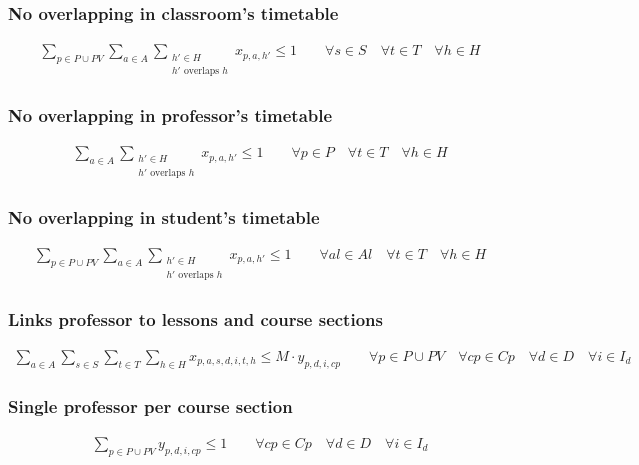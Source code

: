 \subsubsection{No overlapping in classroom's timetable}
\begin{eqnarray}
\sum\limits_{p \in P \cup PV} \sum\limits_{a \in A} \sum\limits_{\substack {h' \in H \\ h'\mbox{ overlaps }h}} x_{p,a,h'} \leq  1 \nonumber \qquad 
\forall s \in S \quad
\forall t \in T \quad
\forall h \in H
\end{eqnarray}

\subsubsection{No overlapping in professor's timetable}
\begin{eqnarray}
\sum\limits_{a \in A} \sum\limits_{\substack {h' \in H \\ h'\mbox{ overlaps }h}} x_{p,a,h'} \leq  1 \nonumber \qquad 
\forall p \in P \quad
\forall t \in T \quad
\forall h \in H
\end{eqnarray}

\subsubsection{No overlapping in student's timetable}
\begin{eqnarray}
\sum\limits_{p \in P \cup PV} \sum\limits_{a \in A} \sum\limits_{\substack {h' \in H \\ h'\mbox{ overlaps }h}}
  x_{p,a,h'} \leq  1 \nonumber \qquad 
\forall al \in Al \quad
\forall t \in T \quad
\forall h \in H
\end{eqnarray}

\subsubsection{Links professor to lessons and course sections}
\begin{eqnarray}
\sum\limits_{a \in A} \sum\limits_{s \in S} \sum\limits_{t \in T} \sum\limits_{h \in H} x_{p,a,s,d,i,t,h} \leq  M \cdot y_{p,d,i,cp} \nonumber \qquad 
\forall p \in P \cup PV \quad
\forall cp \in Cp \quad
\forall d \in D \quad
\forall i \in I_{d}
\end{eqnarray}

\subsubsection{Single professor per course section}
\begin{eqnarray}
\sum\limits_{p \in P \cup PV} y_{p,d,i,cp} \leq 1 \nonumber \qquad
\forall cp \in Cp \quad
\forall d \in D \quad
\forall i \in I_{d}
\end{eqnarray}

